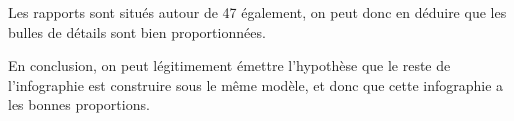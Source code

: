 \begin{corrige}
   Les rapports sont situés autour de 47 également, on peut donc en déduire que les bulles de détails sont bien proportionnées. \smallskip
   
   {\red En conclusion, on peut légitimement émettre l'hypothèse que le reste de l'infographie est construire sous le même modèle, et donc que cette infographie a les bonnes proportions}.

\end{corrige}
